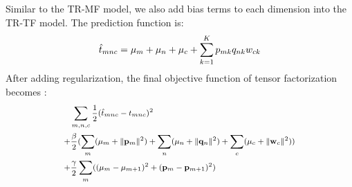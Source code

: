 %
Similar to the TR-MF model, we also add bias terms to each dimension into the TR-TF model. The prediction function is:
\begin{equation*}
\small
\hat{t}_{mnc}=\mu_m+\mu_n+\mu_c+\sum\limits_{k=1}^{K}{p_{mk} q_{nk} w_{ck}}
\end{equation*}
%
After adding regularization, the final objective function of tensor factorization becomes :\\
\begin{equation*}
\small
\begin{aligned}
&\sum\limits_{m, n, c} \frac{1}{2}(\hat{t}_{mnc}- t_{mnc})^2\\
+ &\frac{\beta}{2}(\sum_m(\mu_m + \|\mathbf{p}_m\|^2) + \sum_n(\mu_n + \|\mathbf{q}_n\|^2) + \sum_c(\mu_c + \|\mathbf{w}_c\|^2))\\
+ &\frac{\gamma}{2}\sum_m((\mu_m-\mu_{m+1})^2 + (\mathbf{p}_m-\mathbf{p}_{m+1})^2)\\
\end{aligned}
\end{equation*}


